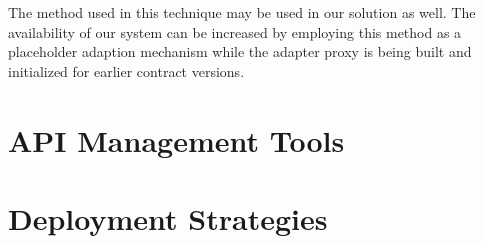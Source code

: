 The method used in this technique may be used in our solution as well.
The availability of our system can be increased by employing this method as a
placeholder adaption mechanism while the adapter proxy is being built and initialized for earlier contract versions.

\section{API Management Tools} %
\label{sec:api_management_tools}

\section{Deployment Strategies} %
\label{sec:deployment_strategies}

